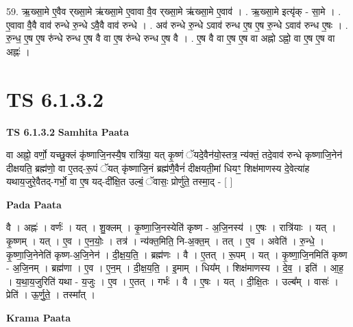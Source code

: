 \documentclass[17pt]{extarticle}
\begin{document}
59. ऋ॒ख्सा॒मे ए॒वैव र्‌ख्सा॒मे ऋ॑ख्सा॒मे ए॒वावा वै॒व र्‌ख्सा॒मे ऋ॑ख्सा॒मे ए॒वाव॑ । . ऋ॒ख्सा॒मे इत्यृ॑क् - सा॒मे । . ए॒वावा वै॒वै वाव॑ रुन्धे रु॒न्धे ऽवै॒वै वाव॑ रुन्धे । . अव॑ रुन्धे रु॒न्धे ऽवाव॑ रुन्ध ए॒ष ए॒ष रु॒न्धे ऽवाव॑ रुन्ध ए॒षः । . रु॒न्ध॒ ए॒ष ए॒ष रु॑न्धे रुन्ध ए॒ष वै वा ए॒ष रु॑न्धे रुन्ध ए॒ष वै । . ए॒ष वै वा ए॒ष ए॒ष वा अह्नो ऽह्नो॒ वा ए॒ष ए॒ष वा अह्नः॑ । \newline
\pagebreak
{}

\section{ TS 6.1.3.2 }

\textbf{TS 6.1.3.2 } \newline
\textbf{Samhita Paata} \newline

वा अह्नो॒ वर्णो॒ यच्छु॒क्लं कृ॑ष्णाजि॒नस्यै॒ष रात्रि॑या॒ यत् कृ॒ष्णं ॅयदे॒वैन॑यो॒स्तत्र॒ न्य॑क्तं॒ तदे॒वाव॑ रुन्धे कृष्णाजि॒नेन॑ दीक्षयति॒ ब्रह्म॑णो॒ वा ए॒तद्-रू॒पं ॅयत् कृ॑ष्णाजि॒नं ब्रह्म॑णै॒वैनं॑ दीक्षयती॒मां धियꣳ॒॒ शिक्ष॑माणस्य दे॒वेत्या॑ह यथाय॒जुरे॒वैतद्-गर्भो॒ वा ए॒ष यद्-दी᳚क्षि॒त उल्बं॒ ॅवासः॒ प्रोर्णु॑ते॒ तस्मा॒द् - [  ] \newline

\textbf{Pada Paata} \newline

वै । अह्नः॑ । वर्णः॑ । यत् । शु॒क्लम् । कृ॒ष्णा॒जि॒नस्येति॑ कृष्ण - अ॒जि॒नस्य॑ । ए॒षः । रात्रि॑याः । यत् । कृ॒ष्णम् । यत् । ए॒व । ए॒न॒योः॒ । तत्र॑ । न्य॑क्त॒मिति॒ नि-अ॒क्त॒म् । तत् । ए॒व । अवेति॑ । रु॒न्धे॒ । कृ॒ष्णा॒जि॒नेनेति॑ कृष्ण-अ॒जि॒नेन॑ । दी॒क्ष॒य॒ति॒ । ब्रह्म॑णः । वै । ए॒तत् । रू॒पम् । यत् । कृ॒ष्णा॒जि॒नमिति॑ कृष्ण - अ॒जि॒नम् । ब्रह्म॑णा । ए॒व । ए॒न॒म् । दी॒क्ष॒य॒ति॒ । इ॒माम् । धिय᳚म् । शिक्ष॑माणस्य । दे॒व॒ । इति॑ । आ॒ह॒ । य॒था॒य॒जुरिति॑ यथा - य॒जुः । ए॒व । ए॒तत् । गर्भः॑ । वै । ए॒षः । यत् । दी॒क्षि॒तः । उल्ब᳚म् । वासः॑ । प्रेति॑ । ऊ॒र्णु॒ते॒ । तस्मा᳚त् ।  \newline


\textbf{Krama Paata} \newline
\end{document}
